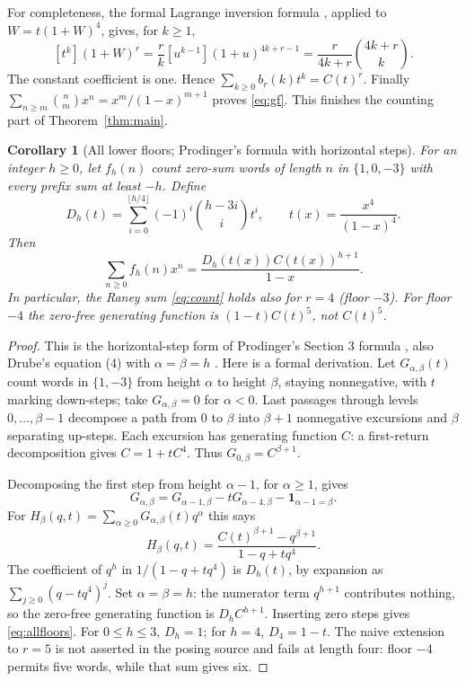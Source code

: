 \documentclass[11pt]{article}
\newtheorem{corollary}[theorem]{Corollary}
\begin{document}
For completeness, the formal Lagrange inversion formula
\cite[Section I.5, formula (69)]{ac}, applied to $W=t(1+W)^4$,
gives, for $k\geq1$,
\[
 [t^k](1+W)^r=\frac r k [u^{k-1}](1+u)^{4k+r-1}
             =\frac r{4k+r}\binom{4k+r}{k}.
\]
The constant coefficient is one. Hence $\sum_{k\geq0}b_r(k)t^k=C(t)^r$.
Finally $\sum_{n\geq m}\binom nm x^n=x^m/(1-x)^{m+1}$ proves
\eqref{eq:gf}. This finishes the counting part of Theorem~\ref{thm:main}.

\begin{corollary}[All lower floors; Prodinger's formula with horizontal steps]
\label{cor:allfloors}
For an integer $h\geq0$, let $f_h(n)$ count zero-sum words of length $n$
in $\{1,0,-3\}$ with every prefix sum at least $-h$. Define
\[
 D_h(t)=\sum_{i=0}^{\lfloor h/4\rfloor}(-1)^i\binom{h-3i}{i}t^i,
 \qquad t(x)=\frac{x^4}{(1-x)^4}.
\]
Then
\begin{equation}\label{eq:allfloors}
 \sum_{n\geq0} f_h(n)x^n=
 \frac{D_h(t(x))C(t(x))^{h+1}}{1-x}.
\end{equation}
In particular, the Raney sum \eqref{eq:count} holds also for $r=4$
(floor $-3$). For floor $-4$ the zero-free generating function is
$(1-t)C(t)^5$, not $C(t)^5$.
\end{corollary}
\begin{proof}
This is the horizontal-step form of Prodinger's Section 3 formula
\cite{prodinger}, also Drube's equation (4) with $\alpha=\beta=h$
\cite{drube}. Here is a formal derivation. Let $G_{\alpha,\beta}(t)$
count words in $\{1,-3\}$ from height $\alpha$ to height $\beta$, staying
nonnegative, with $t$ marking down-steps; take $G_{\alpha,\beta}=0$ for
$\alpha<0$. Last passages through levels $0,\ldots,\beta-1$ decompose
a path from $0$ to $\beta$ into $\beta+1$ nonnegative excursions and
$\beta$ separating up-steps. Each excursion has generating function $C$:
a first-return decomposition gives $C=1+tC^4$. Thus
$G_{0,\beta}=C^{\beta+1}$.

Decomposing the first step from height $\alpha-1$, for $\alpha\geq1$,
gives
\[
 G_{\alpha,\beta}=G_{\alpha-1,\beta}-tG_{\alpha-4,\beta}
                   -\boldsymbol{1}_{\alpha-1=\beta}.
\]
For $H_\beta(q,t)=\sum_{\alpha\geq0}G_{\alpha,\beta}(t)q^\alpha$
this says
\[
 H_\beta(q,t)=\frac{C(t)^{\beta+1}-q^{\beta+1}}{1-q+tq^4}.
\]
The coefficient of $q^h$ in $1/(1-q+tq^4)$ is $D_h(t)$, by expansion
as $\sum_{j\geq0}(q-tq^4)^j$. Set $\alpha=\beta=h$: the numerator
term $q^{h+1}$ contributes nothing, so the zero-free generating function
is $D_h C^{h+1}$. Inserting zero steps gives \eqref{eq:allfloors}.
For $0\leq h\leq3$, $D_h=1$; for $h=4$, $D_4=1-t$.
The naive extension to $r=5$ is not asserted in the posing source and
fails at length four: floor $-4$ permits five words, while that sum gives six.
\end{proof}
\end{document}

